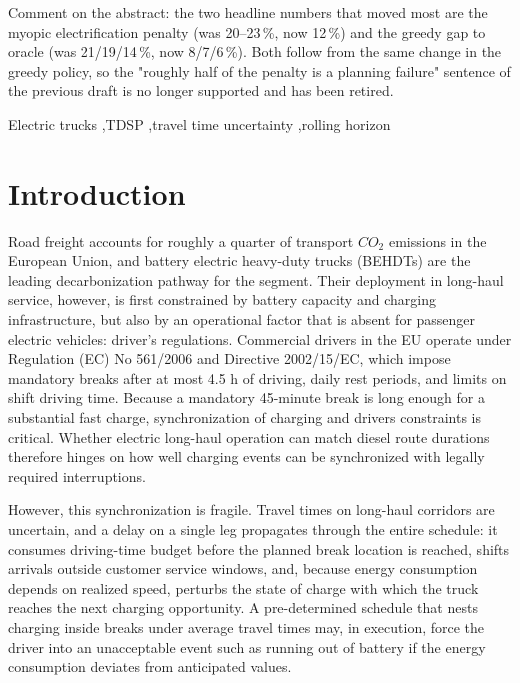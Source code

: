 \documentclass[preprint,12pt,3p]{elsarticle}
\newcommand{\green}[1]{{\color{darkgreen}#1}}
\begin{document}
\begin{frontmatter}
\begin{abstract}
\end{abstract}

\green{Comment on the abstract: the two headline numbers that moved most are the
myopic electrification penalty (was 20--23\,\%, now 12\,\%) and the greedy gap to
oracle (was 21/19/14\,\%, now 8/7/6\,\%). Both follow from the same change in the
greedy policy, so the "roughly half of the penalty is a planning failure"
sentence of the previous draft is no longer supported and has been retired.}


\begin{keyword}
Electric trucks \sep TDSP \sep travel time uncertainty \sep rolling horizon
\end{keyword}

\end{frontmatter}






\section{Introduction} \label{intro}
Road freight accounts for roughly a quarter of transport $CO_2$ emissions in the European Union, and battery electric heavy-duty trucks (BEHDTs) are the leading decarbonization pathway for the segment. Their deployment in long-haul  service, however, is first constrained by battery capacity and charging infrastructure, but also by an operational factor that is absent for passenger electric vehicles: driver's regulations. Commercial drivers in the EU operate under Regulation (EC) No 561/2006 and Directive 2002/15/EC, which impose mandatory breaks after at most 4.5 h of driving, daily rest periods, and limits on shift driving time.
Because a mandatory 45-minute break is long enough for a substantial fast charge, synchronization of charging and drivers constraints is critical. Whether electric long-haul operation can match diesel route durations therefore hinges on how well charging events can be synchronized with legally required interruptions.

However, this synchronization is fragile. Travel times on long-haul corridors are uncertain, and a delay on a single leg propagates through the entire schedule: it consumes driving-time budget before the planned break location is reached, shifts arrivals outside customer service windows, and, because energy consumption depends on realized speed, perturbs the state of charge with which the truck reaches the next charging opportunity. A pre-determined schedule that nests charging inside breaks under average travel times may, in execution, force
the driver into an unacceptable event such as running out of battery if the energy consumption deviates from anticipated values.
\end{document}
